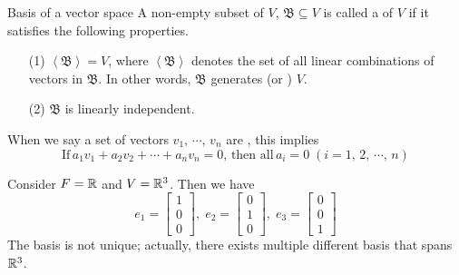 \documentclass[a4paper, 10pt]{article}
\begin{document}

\begin{definition}{Basis of a vector space}
    A non-empty subset of $V$, $\mathfrak{B} \subseteq V$ is called a  of $V$ if it satisfies the following properties.
    \begin{itemize}
        \item[(1)] $\left< \mathfrak{B} \right> = V$, where $\left< \mathfrak{B} \right>$ denotes the set of all linear combinations of vectors in $\mathfrak{B}$.
        In other words, $\mathfrak{B}$ generates (or ) $V$.
        \item[(2)] $\mathfrak{B}$ is linearly independent.
    \end{itemize}
\end{definition}
\begin{remark}
    When we say a set of vectors $v_{1}, \, \cdots, \, v_{n}$ are , this implies
    \[ \text{If} \, a_{1}v_{1} + a_{2}v_{2} + \cdots + a_{n}v_{n} = 0, \, \text{then all} \, a_{i} = 0 \; (i = 1, \, 2, \, \cdots, \, n) \]
\end{remark}
\begin{example}
    Consider $F = \mathbb{R}$ and $V = \mathbb{R}^{3}$. Then we have 
    \[ e_{1} = \begin{bmatrix}1\\ 0\\ 0\end{bmatrix}, \; e_{2} = \begin{bmatrix}0\\ 1\\ 0\end{bmatrix}, \; e_{3} = \begin{bmatrix}0\\ 0\\ 1\end{bmatrix} \]
    The basis is not unique; actually, there exists multiple different basis that spans $\mathbb{R}^{3}$.
\end{example}
\end{document}
